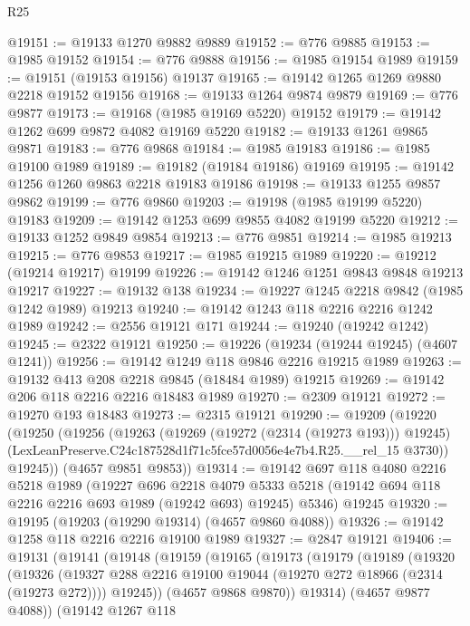 \begin{lexlean}{R25}
\begin{coremodule}
@19151 := @19133 @1270 @9882 @9889
@19152 := @776 @9885
@19153 := @1985 @19152
@19154 := @776 @9888
@19156 := @1985 @19154 @1989
@19159 := @19151 (@19153 @19156) @19137
@19165 := @19142 @1265 @1269 @9880 @2218 @19152 @19156
@19168 := @19133 @1264 @9874 @9879
@19169 := @776 @9877
@19173 := @19168 (@1985 @19169 @5220) @19152
@19179 := @19142 @1262 @699 @9872 @4082 @19169 @5220
@19182 := @19133 @1261 @9865 @9871
@19183 := @776 @9868
@19184 := @1985 @19183
@19186 := @1985 @19100 @1989
@19189 := @19182 (@19184 @19186) @19169
@19195 := @19142 @1256 @1260 @9863 @2218 @19183 @19186
@19198 := @19133 @1255 @9857 @9862
@19199 := @776 @9860
@19203 := @19198 (@1985 @19199 @5220) @19183
@19209 := @19142 @1253 @699 @9855 @4082 @19199 @5220
@19212 := @19133 @1252 @9849 @9854
@19213 := @776 @9851
@19214 := @1985 @19213
@19215 := @776 @9853
@19217 := @1985 @19215 @1989
@19220 := @19212 (@19214 @19217) @19199
@19226 := @19142 @1246 @1251 @9843 @9848 @19213 @19217
@19227 := @19132 @138
@19234 := @19227 @1245 @2218 @9842 (@1985 @1242 @1989) @19213
@19240 := @19142 @1243 @118 @2216 @2216 @1242 @1989
@19242 := @2556 @19121 @171
@19244 := @19240 (@19242 @1242)
@19245 := @2322 @19121
@19250 := @19226 (@19234 (@19244 @19245) (@4607 @1241))
@19256 := @19142 @1249 @118 @9846 @2216 @19215 @1989
@19263 := @19132 @413 @208 @2218 @9845 (@18484 @1989) @19215
@19269 := @19142 @206 @118 @2216 @2216 @18483 @1989
@19270 := @2309 @19121
@19272 := @19270 @193 @18483
@19273 := @2315 @19121
@19290 := @19209
    (@19220
      (@19250
        (@19256
          (@19263
            (@19269 (@19272 (@2314 (@19273 @193))) @19245)
            (LexLeanPreserve.C24c187528d1f71c5fce57d0056e4e7b4.R25.__rel_15 @3730))
          @19245))
      (@4657 @9851 @9853))
@19314 := @19142
    @697
    @118
    @4080
    @2216
    @5218
    @1989
    (@19227
      @696
      @2218
      @4079
      @5333
      @5218
      (@19142 @694 @118 @2216 @2216 @693 @1989 (@19242 @693) @19245)
      @5346)
    @19245
@19320 := @19195 (@19203 (@19290 @19314) (@4657 @9860 @4088))
@19326 := @19142 @1258 @118 @2216 @2216 @19100 @1989
@19327 := @2847 @19121
@19406 := @19131
    (@19141
      (@19148
        (@19159
          (@19165
            (@19173
              (@19179
                (@19189
                  (@19320
                    (@19326
                      (@19327 @288 @2216 @19100 @19044 (@19270 @272 @18966 (@2314 (@19273 @272))))
                      @19245))
                  (@4657 @9868 @9870))
                @19314)
              (@4657 @9877 @4088))
            (@19142
              @1267
              @118

\end{coremodule}
\end{lexlean}
